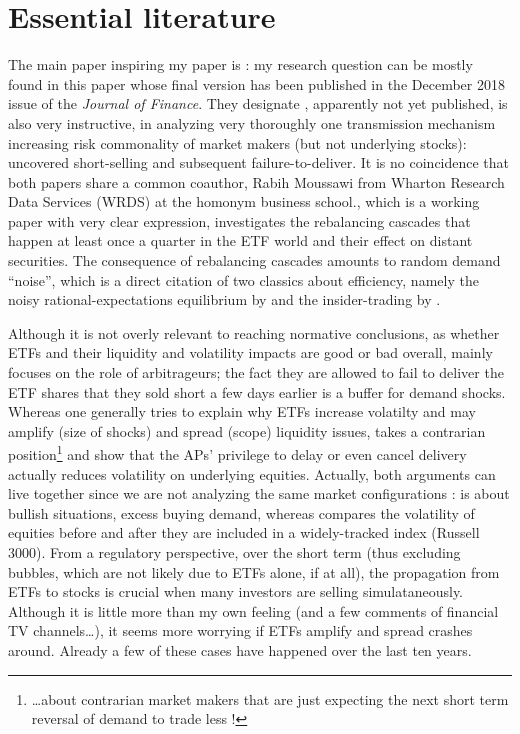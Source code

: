 \documentclass[a4paper, twoside, listof=totoc, toc=sectionentrywithdots]{scrartcl}
\begin{document}
\section{Essential literature}
The main paper inspiring my paper is \cite{Ben-David2018}: my research question can be mostly found in this paper whose final version has been published in the December 2018 issue of the \textit{Journal of Finance}. They designate  \cite{Evans2017}, apparently not yet published, is also very instructive, in analyzing very thoroughly one transmission mechanism increasing risk commonality of market makers (but not underlying stocks): uncovered short-selling and subsequent failure-to-deliver. It is no coincidence that both papers share a common coauthor, Rabih Moussawi from Wharton Research Data Services (WRDS) at the homonym business school.\cite{Chinco2016}, which is a working paper with very clear expression, investigates the rebalancing cascades that happen at least once a quarter in the ETF world and their effect on distant securities. The consequence of rebalancing cascades amounts to random demand ``noise'', which is a direct citation of two classics about efficiency, namely the noisy rational-expectations equilibrium by \cite{Grossman1980} and the insider-trading by \cite{Kyle1985}. 

Although it is not overly relevant to reaching normative conclusions, as whether ETFs and their liquidity and volatility impacts are good or bad overall, \cite{Evans2017} mainly focuses on the role of arbitrageurs; the fact they are allowed to fail to deliver the ETF shares that they sold short a few days earlier is a buffer for demand shocks. Whereas one generally tries to explain why ETFs increase volatilty and may amplify (size of shocks) and spread (scope) liquidity issues, \cite{Evans2017} takes a contrarian position\footnote{\dots about contrarian market makers that are just expecting the next short term reversal of demand to trade less !} and show that the APs' privilege to delay or even cancel delivery actually reduces volatility on underlying equities. Actually, both arguments can live together since we are not analyzing the same market configurations : \cite{Evans2017} is about bullish situations, excess buying demand, whereas \cite{Ben-David2018} compares the volatility of equities before and after they are included in a widely-tracked index (Russell 3000). From a regulatory perspective, over the short term (thus excluding bubbles, which are not likely due to ETFs alone, if at all), the propagation from ETFs to stocks is crucial when many investors are selling simulataneously. Although it is little more than my own feeling (and a few comments of financial TV channels\dots), it seems more worrying if ETFs amplify and spread crashes around. Already a few of these cases have happened over the last ten years.
\end{document}
